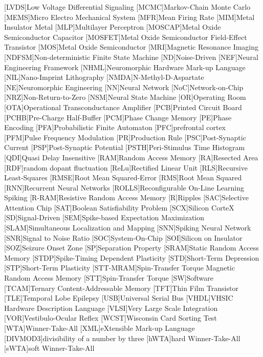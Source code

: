 \begin{acronym}
[LVDS]{Low Voltage Differential Signaling}
[MCMC]{Markov-Chain Monte Carlo}
[MEMS]{Micro Electro Mechanical System}
[MFR]{Mean Firing Rate}
[MIM]{Metal Insulator Metal}
[MLP]{Multilayer Perceptron}
[MOSCAP]{Metal Oxide Semiconductor Capacitor}
[MOSFET]{Metal Oxide Semiconductor Field-Effect Transistor}
[MOS]{Metal Oxide Semiconductor}
[MRI]{Magnetic Resonance Imaging}
[NDFSM]{Non-deterministic Finite State Machine} 
[ND]{Noise-Driven}
[NEF]{Neural Engineering Framework}
[NHML]{Neuromorphic Hardware Mark-up Language}
[NIL]{Nano-Imprint Lithography}
[NMDA]{N-Methyl-D-Aspartate}
[NE]{Neuromorphic Engineering}
[NN]{Neural Network}
[NoC]{Network-on-Chip}
[NRZ]{Non-Return-to-Zero}
[NSM]{Neural State Machine}
[OR]{Operating Room}
[OTA]{Operational Transconductance Amplifier}
[PCB]{Printed Circuit Board}
[PCHB]{Pre-Charge Half-Buffer}
[PCM]{Phase Change Memory}
[PE]{Phase Encoding}
[PFA]{Probabilistic Finite Automaton}
[PFC]{prefrontal cortex}
[PFM]{Pulse Frequency Modulation}
[PR]{Production Rule}
[PSC]{Post-Synaptic Current}
[PSP]{Post-Synaptic Potential}
[PSTH]{Peri-Stimulus Time Histogram}
[QDI]{Quasi Delay Insensitive}
[RAM]{Random Access Memory}
[RA]{Resected Area}
[RDF]{random dopant fluctuation}
[ReLu]{Rectified Linear Unit}
[RLS]{Recursive Least-Squares}
[RMSE]{Root Mean Squared-Error}
[RMS]{Root Mean Squared}
[RNN]{Recurrent Neural Networks}
[ROLLS]{Reconfigurable On-Line Learning Spiking}
[R-RAM]{Resistive Random Access Memory}
[R]{Ripples}
[SAC]{Selective Attention Chip}
[SAT]{Boolean Satisfiability Problem}
[SCX]{Silicon CorteX}
[SD]{Signal-Driven}
[SEM]{Spike-based Expectation Maximization}
[SLAM]{Simultaneous Localization and Mapping}
[SNN]{Spiking Neural Network}
[SNR]{Signal to Noise Ratio}
[SOC]{System-On-Chip}
[SOI]{Silicon on Insulator}
[SOZ]{Seizure Onset Zone}
[SP]{Separation Property}
[SRAM]{Static Random Access Memory}
[STDP]{Spike-Timing Dependent Plasticity}
[STD]{Short-Term Depression}
[STP]{Short-Term Plasticity}
[STT-MRAM]{Spin-Transfer Torque Magnetic Random Access Memory}
[STT]{Spin-Transfer Torque}
[SW]{Software}
[TCAM]{Ternary Content-Addressable Memory}
[TFT]{Thin Film Transistor}
[TLE]{Temporal Lobe Epilepsy}
[USB]{Universal Serial Bus}
[VHDL]{VHSIC Hardware Description Language}
[VLSI]{Very Large Scale Integration}
[VOR]{Vestibulo-Ocular Reflex}
[WCST]{Wisconsin Card Sorting Test}
[WTA]{Winner-Take-All}
[XML]{eXtensible Mark-up Language}
[DIVMOD3]{divisibility of a number by three}
[hWTA]{hard Winner-Take-All}
[sWTA]{soft Winner-Take-All}
\end{acronym}
